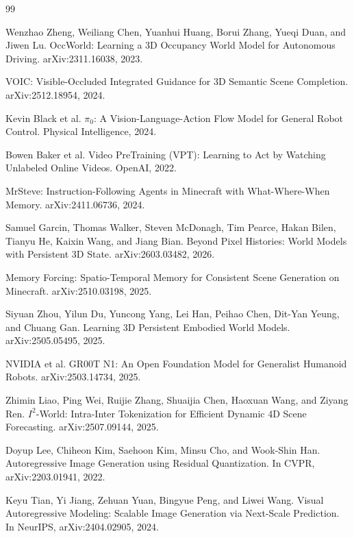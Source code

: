 \documentclass[11pt,a4paper]{article}
\begin{document}

\begin{thebibliography}{99}

Wenzhao Zheng, Weiliang Chen, Yuanhui Huang, Borui Zhang, Yueqi Duan, and Jiwen Lu.
\newblock OccWorld: Learning a 3D Occupancy World Model for Autonomous Driving.
\newblock arXiv:2311.16038, 2023.

VOIC: Visible-Occluded Integrated Guidance for 3D Semantic Scene Completion.
\newblock arXiv:2512.18954, 2024.

Kevin Black et al.
\newblock $\pi_0$: A Vision-Language-Action Flow Model for General Robot Control.
\newblock Physical Intelligence, 2024.

Bowen Baker et al.
\newblock Video PreTraining (VPT): Learning to Act by Watching Unlabeled Online Videos.
\newblock OpenAI, 2022.

MrSteve: Instruction-Following Agents in Minecraft with What-Where-When Memory.
\newblock arXiv:2411.06736, 2024.

Samuel Garcin, Thomas Walker, Steven McDonagh, Tim Pearce, Hakan Bilen, Tianyu He, Kaixin Wang, and Jiang Bian.
\newblock Beyond Pixel Histories: World Models with Persistent 3D State.
\newblock arXiv:2603.03482, 2026.

Memory Forcing: Spatio-Temporal Memory for Consistent Scene Generation on Minecraft.
\newblock arXiv:2510.03198, 2025.

Siyuan Zhou, Yilun Du, Yuncong Yang, Lei Han, Peihao Chen, Dit-Yan Yeung, and Chuang Gan.
\newblock Learning 3D Persistent Embodied World Models.
\newblock arXiv:2505.05495, 2025.

NVIDIA et al.
\newblock GR00T N1: An Open Foundation Model for Generalist Humanoid Robots.
\newblock arXiv:2503.14734, 2025.

Zhimin Liao, Ping Wei, Ruijie Zhang, Shuaijia Chen, Haoxuan Wang, and Ziyang Ren.
\newblock $I^2$-World: Intra-Inter Tokenization for Efficient Dynamic 4D Scene Forecasting.
\newblock arXiv:2507.09144, 2025.

Doyup Lee, Chiheon Kim, Saehoon Kim, Minsu Cho, and Wook-Shin Han.
\newblock Autoregressive Image Generation using Residual Quantization.
\newblock In CVPR, arXiv:2203.01941, 2022.

Keyu Tian, Yi Jiang, Zehuan Yuan, Bingyue Peng, and Liwei Wang.
\newblock Visual Autoregressive Modeling: Scalable Image Generation via Next-Scale Prediction.
\newblock In NeurIPS, arXiv:2404.02905, 2024.


\end{thebibliography}
\end{document}
